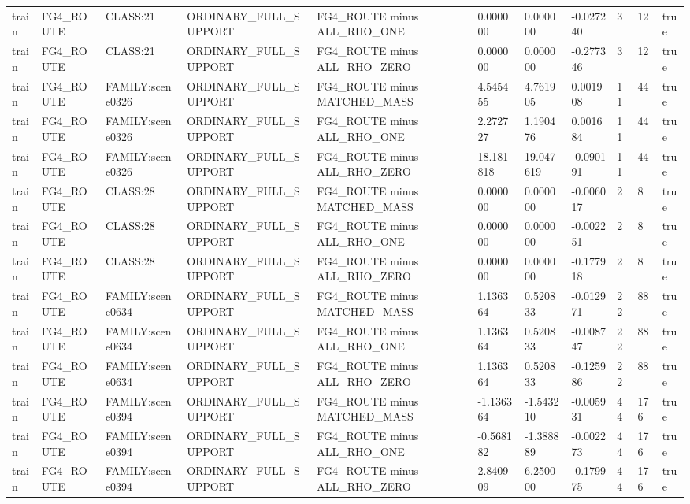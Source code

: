 \begin{tabular}{lllllllllll}
train & FG4\_ROUTE & CLASS:21 & ORDINARY\_FULL\_SUPPORT & FG4\_ROUTE minus ALL\_RHO\_ONE & 0.000000 & 0.000000 & -0.027240 & 3 & 12 & true \\
train & FG4\_ROUTE & CLASS:21 & ORDINARY\_FULL\_SUPPORT & FG4\_ROUTE minus ALL\_RHO\_ZERO & 0.000000 & 0.000000 & -0.277346 & 3 & 12 & true \\
train & FG4\_ROUTE & FAMILY:scene0326 & ORDINARY\_FULL\_SUPPORT & FG4\_ROUTE minus MATCHED\_MASS & 4.545455 & 4.761905 & 0.001908 & 11 & 44 & true \\
train & FG4\_ROUTE & FAMILY:scene0326 & ORDINARY\_FULL\_SUPPORT & FG4\_ROUTE minus ALL\_RHO\_ONE & 2.272727 & 1.190476 & 0.001684 & 11 & 44 & true \\
train & FG4\_ROUTE & FAMILY:scene0326 & ORDINARY\_FULL\_SUPPORT & FG4\_ROUTE minus ALL\_RHO\_ZERO & 18.181818 & 19.047619 & -0.090191 & 11 & 44 & true \\
train & FG4\_ROUTE & CLASS:28 & ORDINARY\_FULL\_SUPPORT & FG4\_ROUTE minus MATCHED\_MASS & 0.000000 & 0.000000 & -0.006017 & 2 & 8 & true \\
train & FG4\_ROUTE & CLASS:28 & ORDINARY\_FULL\_SUPPORT & FG4\_ROUTE minus ALL\_RHO\_ONE & 0.000000 & 0.000000 & -0.002251 & 2 & 8 & true \\
train & FG4\_ROUTE & CLASS:28 & ORDINARY\_FULL\_SUPPORT & FG4\_ROUTE minus ALL\_RHO\_ZERO & 0.000000 & 0.000000 & -0.177918 & 2 & 8 & true \\
train & FG4\_ROUTE & FAMILY:scene0634 & ORDINARY\_FULL\_SUPPORT & FG4\_ROUTE minus MATCHED\_MASS & 1.136364 & 0.520833 & -0.012971 & 22 & 88 & true \\
train & FG4\_ROUTE & FAMILY:scene0634 & ORDINARY\_FULL\_SUPPORT & FG4\_ROUTE minus ALL\_RHO\_ONE & 1.136364 & 0.520833 & -0.008747 & 22 & 88 & true \\
train & FG4\_ROUTE & FAMILY:scene0634 & ORDINARY\_FULL\_SUPPORT & FG4\_ROUTE minus ALL\_RHO\_ZERO & 1.136364 & 0.520833 & -0.125986 & 22 & 88 & true \\
train & FG4\_ROUTE & FAMILY:scene0394 & ORDINARY\_FULL\_SUPPORT & FG4\_ROUTE minus MATCHED\_MASS & -1.136364 & -1.543210 & -0.005931 & 44 & 176 & true \\
train & FG4\_ROUTE & FAMILY:scene0394 & ORDINARY\_FULL\_SUPPORT & FG4\_ROUTE minus ALL\_RHO\_ONE & -0.568182 & -1.388889 & -0.002273 & 44 & 176 & true \\
train & FG4\_ROUTE & FAMILY:scene0394 & ORDINARY\_FULL\_SUPPORT & FG4\_ROUTE minus ALL\_RHO\_ZERO & 2.840909 & 6.250000 & -0.179975 & 44 & 176 & true \\

\end{tabular}
